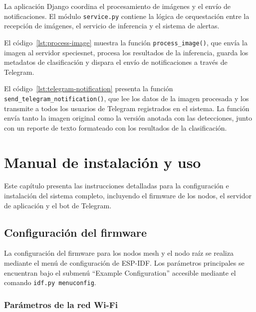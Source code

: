 \documentclass[a4paper, 12pt]{report}
\begin{document}
La aplicación Django coordina el procesamiento de imágenes y el envío de
notificaciones. El módulo \texttt{service.py} contiene la lógica de
orquestación entre la recepción de imágenes, el servicio de \gls{inferencia}
y el sistema de alertas.

El código~\ref{lst:process-image} muestra la función \texttt{process\_image()},
que envía la imagen al servidor \gls{speciesnet}, procesa los resultados de
la \gls{inferencia}, guarda los metadatos de clasificación y dispara el envío
de notificaciones a través de Telegram.



El código~\ref{lst:telegram-notification} presenta la función
\texttt{send\_telegram\_notification()}, que lee los datos de la imagen
procesada y los transmite a todos los usuarios de Telegram registrados
en el sistema. La función envía tanto la imagen original como la versión
anotada con las detecciones, junto con un reporte de texto formateado
con los resultados de la clasificación.



\chapter{Manual de instalación y uso}

Este capítulo presenta las instrucciones detalladas para la configuración e
instalación del sistema completo, incluyendo el firmware de los nodos, el
servidor de aplicación y el bot de Telegram.

\section{Configuración del firmware}

La configuración del firmware para los nodos mesh y el nodo raíz se realiza
mediante el menú de configuración de ESP-IDF. Los parámetros principales
se encuentran bajo el submenú ``Example Configuration'' accesible mediante
el comando \texttt{idf.py menuconfig}.

\subsection{Parámetros de la red Wi-Fi}
\end{document}
